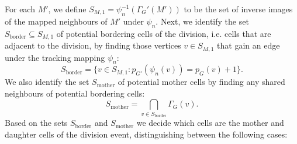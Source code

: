 \documentclass[a4paper,11pt]{article}
\begin{document}

For each $M'$, we define $S_{M,1} = \psi^{-1}_n(\Gamma_G'(M'))$ to be the set of inverse images of the mapped neighbours of $M'$ under $\psi_{n}$. 
Next, we identify the set $S_{\mathrm{border}} \subseteq S_{M,1}$ of potential bordering cells of the division, i.e. cells that are adjacent to the division, by finding those vertices $v \in S_{M,1}$ that gain an edge under the tracking mapping $\psi_{n}$:
%
\begin{equation}
S_{\mathrm{border}} = \{ v \in S_{M,1} : p_{G'}(\psi_{n}(v)) = p_{G}(v) + 1 \}.
\end{equation}
%
We also identify the set $S_{\mathrm{mother}}$ of potential mother cells by finding any shared neighbours of potential bordering cells:
%
\begin{equation}
S_{\mathrm{mother}} = \bigcap_{v \in S_{\mathrm{border}}} \Gamma_G(v).
\end{equation}
%
Based on the sets $S_{\mathrm{border}}$ and $S_{\mathrm{mother}}$ we decide which cells are the mother and daughter cells of the division event, distinguishing between the following cases:
\end{document}
